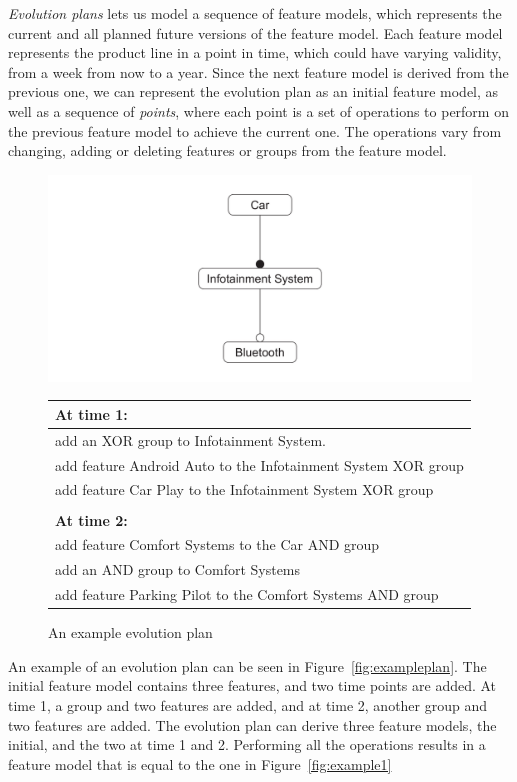 \documentclass[a4paper,english]{ifimaster}
\begin{document}
\textit{Evolution plans} lets us model a sequence of feature models, which represents the current and all planned future versions of the feature model. Each feature model represents the product line in a point in time, which could have varying validity, from a week from now to a year. Since the next feature model is derived from the previous one, we can represent the evolution plan as an initial feature model, as well as a sequence of \textit{points}, where each point is a set of operations to perform on the previous feature model to achieve the current one. The operations vary from changing, adding or deleting features or groups from the feature model.

\begin{figure}[htpb]
	\centering
	\includegraphics[width=0.8\linewidth]{illustrations/initial.pdf}
	\begin{tabular}{l}
		\textbf{At time 1:}                                           \\ \hline
		add an XOR group to Infotainment System.                      \\
		add feature Android Auto to the Infotainment System XOR group \\
		add feature Car Play to the Infotainment System XOR group     \\
		\\
		\textbf{At time 2:}                                           \\ \hline
		add feature Comfort Systems to the Car AND group              \\
		add an AND group to Comfort Systems                           \\
		add feature Parking Pilot to the Comfort Systems AND group
	\end{tabular}
	\caption{An example evolution plan}%
	\label{fig:exampleplan}
\end{figure}

An example of an evolution plan can be seen in Figure~\vref{fig:exampleplan}. The initial feature model contains three features, and two time points are added. At time 1, a group and two features are added, and at time 2, another group and two features are added. The evolution plan can derive three feature models, the initial, and the two at time 1 and 2. Performing all the operations results in a feature model that is equal to the one in Figure~\vref{fig:example1}
\end{document}
